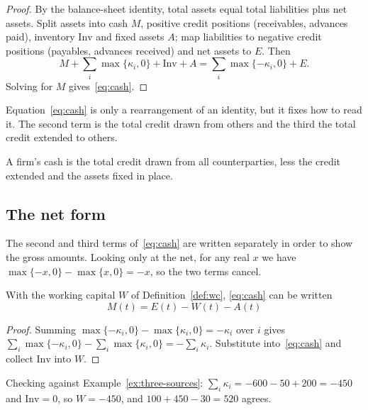 \begin{proof}
By the balance-sheet identity, total assets equal total liabilities plus net assets.
Split assets into cash $M$, positive credit positions (receivables, advances paid),
inventory $\mathrm{Inv}$ and fixed assets $A$; map liabilities to negative credit positions
(payables, advances received) and net assets to $E$. Then
\[
M + \sum_i \max\{\kappa_i,0\} + \mathrm{Inv} + A
= \sum_i \max\{-\kappa_i,0\} + E .
\]
Solving for $M$ gives~\eqref{eq:cash}.
\end{proof}

Equation~\eqref{eq:cash} is only a rearrangement of an identity, but it fixes how to read it.
The second term is the total credit drawn from others and the third the total credit extended
to others.

\begin{corollary}
A firm's cash is the total credit drawn from all counterparties, less the credit extended
and the assets fixed in place.
\end{corollary}

\subsection{The net form}
\label{sec:cash-net}

The second and third terms of~\eqref{eq:cash} are written separately in order to show the
gross amounts. Looking only at the net, for any real $x$ we have
$\max\{-x,0\}-\max\{x,0\}=-x$, so the two terms cancel.

\begin{proposition}
\label{prop:cash-net}
With the working capital $W$ of Definition~\ref{def:wc}, \eqref{eq:cash} can be written
\begin{equation}
M(t) = E(t) - W(t) - A(t)
\label{eq:cash-net}
\end{equation}
\end{proposition}

\begin{proof}
Summing $\max\{-\kappa_i,0\}-\max\{\kappa_i,0\}=-\kappa_i$ over $i$ gives
$\sum_i\max\{-\kappa_i,0\}-\sum_i\max\{\kappa_i,0\}=-\sum_i\kappa_i$.
Substitute into~\eqref{eq:cash} and collect $\mathrm{Inv}$ into $W$.
\end{proof}

Checking against Example~\ref{ex:three-sources}: $\sum_i\kappa_i=-600-50+200=-450$ and
$\mathrm{Inv}=0$, so $W=-450$, and $100+450-30=520$ agrees.


